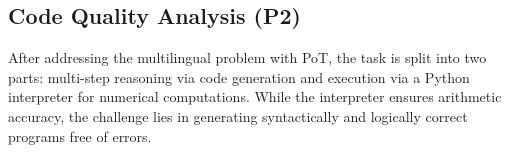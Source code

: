 




\subsection{Code Quality Analysis (P2)} \label{subsec:code_analysis}


%
%
After addressing the multilingual problem with PoT, the task is split into two parts: multi-step reasoning via code generation and execution via a Python interpreter for numerical computations.
While the interpreter ensures arithmetic accuracy, the challenge lies in generating syntactically and logically correct programs free of errors.


